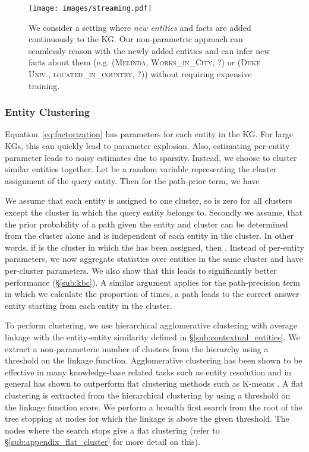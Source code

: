 \documentclass[11pt,a4paper]{article}
\begin{document}
\begin{figure*}
    \centering
    \texttt{[image: images/streaming.pdf]}
    \caption{We consider a setting where \emph{new entities} and facts are added continuously to the KG. Our non-parametric approach can seamlessly reason with the newly added entities and can infer new facts about them (e.g. (\textsc{Melinda}, \textsc{Works\_in\_City}, ?) or (\textsc{Duke Univ.}, \textsc{located\_in\_country}, ?)) without requiring expensive training.}
    \label{fig:open_world}
\end{figure*}

\subsubsection{Entity Clustering}
\label{sub:entity_clustering}
Equation~\ref{eq:factorization} has parameters for each entity in the KG. For large KGs, this can quickly lead to parameter explosion. Also, estimating per-entity parameter leads to noisy estimates due to sparsity. Instead, we choose to cluster similar entities together. Let  be a random variable representing the cluster assignment of the query entity. Then for the path-prior term, we have 


We assume that each entity is assigned to one cluster, so  is zero for all clusters except the cluster in which the query entity belongs to. Secondly we assume, that the prior probability of a path given the entity and cluster can be determined from the cluster alone and is independent of each entity in the cluster. In other words, if  is the cluster in which the  has been assigned, then . Instead of per-entity parameters, we now aggregate statistics over entities in the same cluster and have per-cluster parameters. We also show that this leads to significantly better performance (\S\ref{sub:kbc}). A similar argument applies for the path-precision term in which we calculate the proportion of times, a path leads to the correct answer entity starting from each entity in the cluster.

To perform clustering, we use hierarchical agglomerative clustering with average linkage with the entity-entity similarity defined in \S \ref{sub:contextual_entities}. 
We extract a non-parameteric number of clusters from the hierarchy using a threshold on the linkage function. Agglomerative clustering has been shown to be effective in many knowledge-base related 
tasks such as entity resolution \cite{lee-etal-2012-joint,vashishth2018cesi} and in general has shown to 
outperform flat clustering methods such as K-means \cite{green2012entity,kobren2017hierarchical}. A flat clustering is extracted from the hierarchical clustering by using a threshold on the linkage function score. We perform a breadth first search from the root of the tree stopping at nodes for which the linkage is above the given threshold. The nodes where the search stops give a flat clustering (refer to \S\ref{sub:appendix_flat_cluster} for more detail on this).
\end{document}
